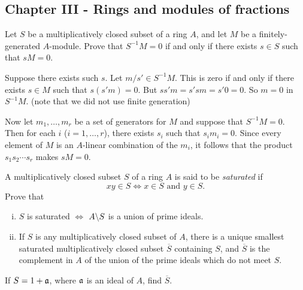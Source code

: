 \documentclass[11pt, english]{article}
\begin{document}
\subsection{Chapter III - Rings and modules of fractions}
\begin{exc}[Exercise 1]

Let $S$ be a multiplicatively closed subset of a ring $A$, and let $M$ be a finitely-generated $A$-module. Prove that $S^{-1}M=0$ if and only if there exists $s \in S$ such that $sM=0$.  
\end{exc}

\begin{sol}
 Suppose there exists such $s$. Let $m/s' \in S^{-1}M$. This is zero if and only if there exists $s \in M$ such that $s(s'm)=0$. But $ss'm=s'sm=s'0=0$. So $m=0$ in $S^{-1}M$.  (note that we did not use finite generation)

Now let $m_1,\ldots,m_r$ be a set of generators for $M$ and suppose that $S^{-1}M=0$. Then for each $i$ ($i=1,\ldots,r$), there exists $s_i$ such that $s_im_i=0$. Since every element of $M$ is an $A$-linear combination of the $m_i$, it follows that the product $s_1s_2\cdots s_r$ makes $sM=0$.
\end{sol}

\begin{exc}
A multiplicatively closed subset $S$ of a ring $A$ is said to be \emph{saturated} if
\[
xy \in S \Leftrightarrow x \in S \text{ and } y \in S.
\]
Prove that
\begin{enumerate}[i)]
\item $S$ is saturated $\Leftrightarrow$ $A \backslash S$ is a union of prime ideals.
\item If $S$ is any multiplicatively closed subset of $A$, there is a unique smallest saturated multiplicatively closed subset $\overline S$ containing $S$, and $\overline S$ is the complement in $A$ of the union of the prime ideals which do not meet $S$. 
\end{enumerate}
If $S = 1 + \mathfrak{a}$, where $\mathfrak{a}$ is an ideal of $A$, find $\overline S$.
\end{exc}
\end{document}
